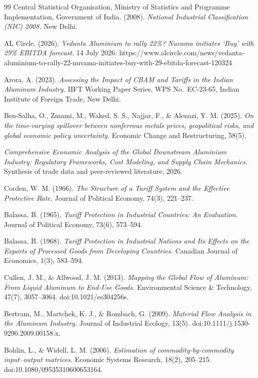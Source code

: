 \documentclass[11pt, a4paper]{article}
\numberwithin{figure}{section}
\numberwithin{table}{section}
\begin{document}
\begin{thebibliography}{99}
Central Statistical Organisation, Ministry of Statistics and Programme Implementation, Government of India. (2008).
\textit{National Industrial Classification (NIC) 2008.}
New Delhi.

AL Circle. (2026).
\textit{Vedanta Aluminium to rally 22\%? Nuvama initiates `Buy' with 29\% EBITDA forecast.}
14 July 2026. https://www.alcircle.com/news/vedanta-aluminium-to-rally-22-nuvama-initiates-buy-with-29-ebitda-forecast-120324

Arora, A. (2023).
\textit{Assessing the Impact of CBAM and Tariffs in the Indian Aluminum Industry.}
IIFT Working Paper Series, WPS No.~EC-23-65, Indian Institute of Foreign Trade, New Delhi.

Ben-Salha, O., Zmami, M., Waked, S. S., Najjar, F., \& Alenazi, Y. M. (2025).
\textit{On the time-varying spillover between nonferrous metals prices, geopolitical risks, and global economic policy uncertainty.}
Economic Change and Restructuring, 58(5).

\textit{Comprehensive Economic Analysis of the Global Downstream Aluminium Industry: Regulatory Frameworks, Cost Modeling, and Supply Chain Mechanics.}
Synthesis of trade data and peer-reviewed literature, 2026.


Corden, W. M. (1966).
\textit{The Structure of a Tariff System and the Effective Protective Rate.}
Journal of Political Economy, 74(3), 221--237.

Balassa, B. (1965).
\textit{Tariff Protection in Industrial Countries: An Evaluation.}
Journal of Political Economy, 73(6), 573--594.

Balassa, B. (1968).
\textit{Tariff Protection in Industrial Nations and Its Effects on the Exports of
Processed Goods from Developing Countries.}
Canadian Journal of Economics, 1(3), 583--594.

Cullen, J. M., \& Allwood, J. M. (2013).
\textit{Mapping the Global Flow of Aluminum: From Liquid Aluminum to End-Use Goods.}
Environmental Science \& Technology, 47(7), 3057--3064. doi:10.1021/es304256s.

Bertram, M., Martchek, K. J., \& Rombach, G. (2009).
\textit{Material Flow Analysis in the Aluminum Industry.}
Journal of Industrial Ecology, 13(5). doi:10.1111/j.1530-9290.2009.00158.x.

Bohlin, L., \& Widell, L. M. (2006).
\textit{Estimation of commodity-by-commodity input--output matrices.}
Economic Systems Research, 18(2), 205--215. doi:10.1080/09535310600653164.


\end{thebibliography}
\end{document}
